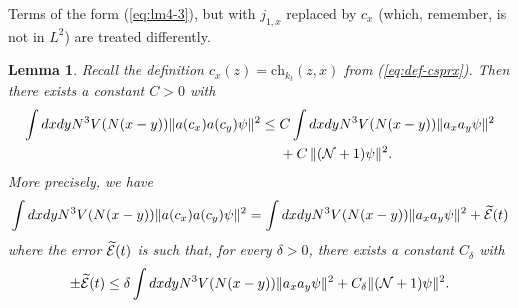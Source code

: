 \documentclass[11pt,a4paper]{article}
\newtheorem{lemma}[thm]{Lemma}
\newcommand{\wt}{\widetilde}
\newcommand{\cE}{{\cal E}}
\newcommand{\cN}{{\cal N}}
\begin{document}
Terms of the form (\ref{eq:lm4-3}), but with $j_{1,x}$ replaced by $c_x$ (which, remember, is not in $L^2$) are treated differently.
\begin{lemma}\label{lm:4b}
Recall the definition $c_x (z) = \text{ch}_{k_t} (z,x)$ from (\ref{eq:def-csprx}). Then there exists a constant $C>0$ with
\begin{equation}\label{eq:lm4b-1}
\begin{split}
\int dx dy N^3 V(N(x-y)) \| a (c_x) a(c_y) \psi \|^2 \leq \; &C \int dx dy N^3 V (N(x-y)) \| a_x a_y \psi \|^2 \\ &+ C\, \| (\cN+1) \psi \|^2. \end{split} \end{equation}
More precisely, we have 
\begin{equation}\label{eq:lm4b-2} \int dx dy N^3 V(N(x-y)) \| a (c_x) a (c_y) \psi \|^2 = \int dx dy N^3 V(N (x-y)) \| a_x a_y \psi \|^2 + \wt{\cE} (t) \end{equation}
where the error $\wt{\cE} (t)$ is such that, for every $\delta > 0$, there exists a constant $C_\delta$ 
with
\[ \pm \wt{\cE} (t) \leq \delta \int dx dy N^3 V (N (x-y)) \| a_x a_y \psi \|^2 + C_\delta \| (\cN+1) \psi \|^2. \]
\end{lemma}
\end{document}
